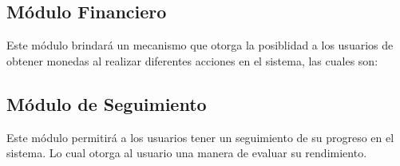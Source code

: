 \subsection*{Módulo Financiero}

 \noindent 
 Este módulo brindará un mecanismo que otorga la posiblidad a los usuarios de 
 obtener monedas al realizar diferentes acciones en el sistema, las cuales son:





\subsection*{Módulo de Seguimiento}

 \noindent
 Este módulo permitirá a los usuarios tener un seguimiento de su progreso en el sistema. 
 Lo cual otorga al usuario una manera de evaluar su rendimiento.


% 

